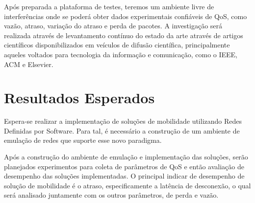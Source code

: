 \documentclass[	12pt, Times, openright, twoside, a4paper, english, brazil]{abntex2}
\begin{document}

Após preparada a plataforma de testes, teremos um ambiente livre de interferências onde se poderá obter dados experimentais confiáveis de QoS, como vazão, atraso, variação do atraso e perda de pacotes. A investigação será realizada através de levantamento contínuo do estado da arte através de artigos científicos disponibilizados em veículos de difusão científica, principalmente aqueles voltados para tecnologia da informação e comunicação, como o IEEE, ACM e Elsevier.

\section{Resultados Esperados}

Espera-se realizar a implementação de soluções de mobilidade utilizando Redes Definidas por Software. Para tal, é necessário a construção de um ambiente de emulação de redes que suporte esse novo paradigma.


Após a construção do ambiente de emulação e implementação das soluções, serão planejados experimentos para coleta de parâmetros de QoS e então avaliação de desempenho das soluções implementadas. O principal indicar de desempenho de solução de mobilidade é o atraso, especificamente a latência de desconexão, o qual será analisado juntamente com os outros parâmetros, de perda e vazão.
\end{document}
